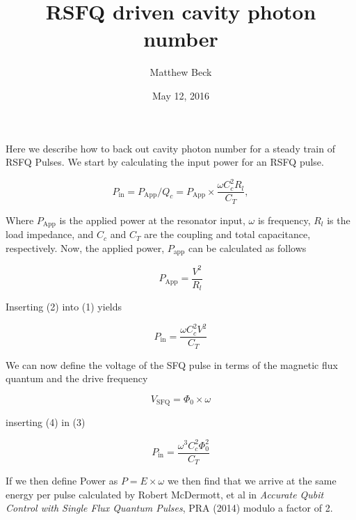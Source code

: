 \documentclass[12pt,reqno]{amsart}
\title{RSFQ driven cavity photon number}
\author{Matthew Beck}
\date{May 12, 2016} %
\begin{document}
\setlength{\parindent}{0pt}

\maketitle


Here we describe how to back out cavity photon number for a steady train of RSFQ Pulses. We start by calculating the input power for an RSFQ pulse.

\begin{equation}
P_\text{in} = P_{\text{App}}/Q_c = P_\text{App}\times\frac{\omega C_c^2 R_l}{C_T},
\end{equation}

Where $P_\text{App}$ is the applied power at the resonator input, $\omega$ is frequency, $R_l$ is the load impedance, and $C_c$ and $C_T$ are the coupling and total capacitance, respectively. Now, the applied power, $P_\text{app}$ can be calculated as follows

\begin{equation}
P_\text{App} = \frac{V^2}{R_l}
\end{equation}

Inserting (2) into (1) yields

\begin{equation}
P_\text{in} = \frac{\omega C_c^2 V^2}{C_T}
\end{equation}

We can now define the voltage of the SFQ pulse in terms of the magnetic flux quantum and the drive frequency

\begin{equation}
V_\text{SFQ} = \Phi_0 \times \omega
\end{equation}

inserting (4) in (3)

\begin{equation}
P_\text{in} = \frac{\omega^3 C_c^2 \Phi_0^2}{C_T}
\end{equation}

If we then define Power as $P = E\times\omega$ we then find that we arrive at the same energy per pulse calculated by Robert McDermott, et al in \textit{Accurate Qubit Control with Single Flux Quantum Pulses}, PRA (2014) modulo a factor of 2.
\end{document}
